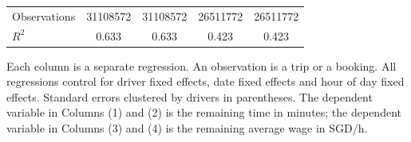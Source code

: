 \documentclass[reviewmode]{restat}
\begin{document}
\begin{table}
{\begin{tabularx}{\textwidth}{l@{\extracolsep{\fill}}*{4}{S}}
		\addlinespace
		Observations        &\num{31108572}         &\num{31108572}         &\num{26511772}         &\num{26511772}         \\
		$R^2$             &     {0.633}         &     {0.633}         &     {0.423}         &     {0.423}         \\
		\bottomrule
		\end{tabularx}
		}

		\begin{tablenotes}
			Each column is a separate regression. An observation is a trip or a booking. All regressions control for driver fixed effects, date fixed effects and hour of day fixed effects. Standard errors clustered by drivers in parentheses. The dependent variable in Columns (1) and (2) is the remaining time in minutes; the dependent variable in Columns (3) and (4) is the remaining average wage in SGD/h.
		\end{tablenotes}
\end{table}
\end{document}
